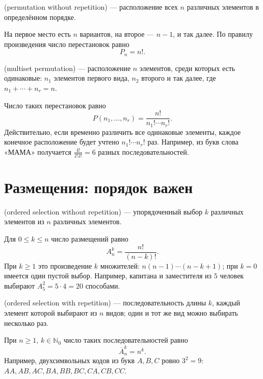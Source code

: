 \begin{definition}
 (permutation without repetition) ---
расположение всех \(n\) различных элементов в определённом порядке.
\end{definition}

На первое место есть \(n\) вариантов, на второе --- \(n-1\), и так далее.
По правилу произведения число перестановок равно
\[
P_n=n!.
\]

\begin{definition}
 (multiset permutation) ---
расположение \(n\) элементов, среди которых есть одинаковые:
\(n_1\) элементов первого вида, \(n_2\) второго и так далее,
где \(n_1+\cdots+n_r=n\).
\end{definition}

Число таких перестановок равно
\[
P(n_1,\ldots,n_r)=\frac{n!}{n_1!\cdots n_r!}.
\]
Действительно, если временно различить все одинаковые элементы,
каждое конечное расположение будет учтено \(n_1!\cdots n_r!\) раз.
Например, из букв слова «МАМА» получается \(\frac{4!}{2!2!}=6\) разных последовательностей.

\section{Размещения: порядок важен}

\begin{definition}
 (ordered selection without repetition) ---
упорядоченный выбор \(k\) различных элементов из \(n\) различных элементов.
\end{definition}

Для \(0\le k\le n\) число размещений равно
\[
A_n^k=\frac{n!}{(n-k)!}.
\]
При \(k\ge1\) это произведение \(k\) множителей:
\(n(n-1)\cdots(n-k+1)\); при \(k=0\) имеется один пустой выбор.
Например, капитана и заместителя из \(5\) человек выбирают \(A_5^2=5\cdot4=20\) способами.

\begin{definition}
 (ordered selection with repetition) ---
последовательность длины \(k\), каждый элемент которой выбирают из \(n\) видов;
один и тот же вид можно выбирать несколько раз.
\end{definition}

При \(n\ge1\), \(k\in\mathbb N_0\) число таких последовательностей равно
\[
\overline A_n^k=n^k.
\]
Например, двухсимвольных кодов из букв \(A,B,C\) ровно \(3^2=9\):
\(AA,AB,AC,BA,BB,BC,CA,CB,CC\).

